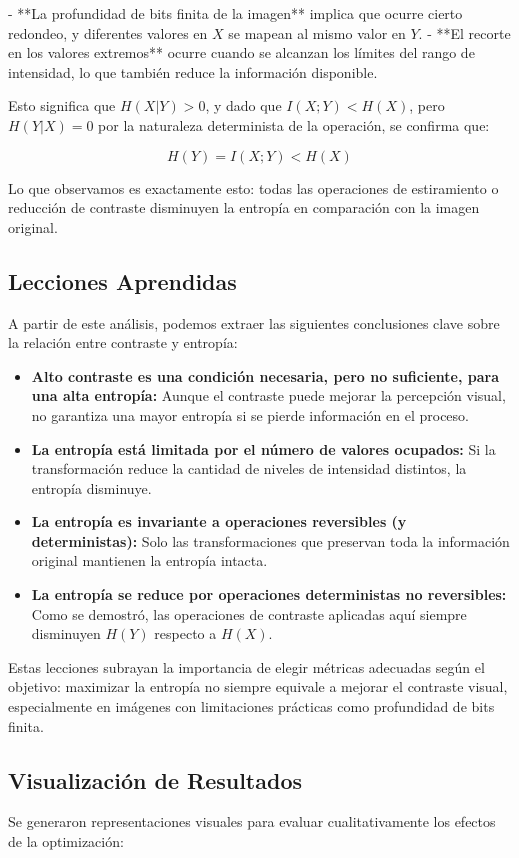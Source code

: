 - **La profundidad de bits finita de la imagen** implica que ocurre cierto redondeo, y diferentes valores en \(X\) se mapean al mismo valor en \(Y\).
- **El recorte en los valores extremos** ocurre cuando se alcanzan los límites del rango de intensidad, lo que también reduce la información disponible.

Esto significa que \(H(X|Y) > 0\), y dado que \(I(X;Y) < H(X)\), pero \(H(Y|X) = 0\) por la naturaleza determinista de la operación, se confirma que:

\[
H(Y) = I(X;Y) < H(X)
\]

Lo que observamos es exactamente esto: todas las operaciones de estiramiento o reducción de contraste disminuyen la entropía en comparación con la imagen original.

\subsection{Lecciones Aprendidas}
A partir de este análisis, podemos extraer las siguientes conclusiones clave sobre la relación entre contraste y entropía:

\begin{itemize}
    \item \textbf{Alto contraste es una condición necesaria, pero no suficiente, para una alta entropía:} Aunque el contraste puede mejorar la percepción visual, no garantiza una mayor entropía si se pierde información en el proceso.
    \item \textbf{La entropía está limitada por el número de valores ocupados:} Si la transformación reduce la cantidad de niveles de intensidad distintos, la entropía disminuye.
    \item \textbf{La entropía es invariante a operaciones reversibles (y deterministas):} Solo las transformaciones que preservan toda la información original mantienen la entropía intacta.
    \item \textbf{La entropía se reduce por operaciones deterministas no reversibles:} Como se demostró, las operaciones de contraste aplicadas aquí siempre disminuyen \(H(Y)\) respecto a \(H(X)\).
\end{itemize}

Estas lecciones subrayan la importancia de elegir métricas adecuadas según el objetivo: maximizar la entropía no siempre equivale a mejorar el contraste visual, especialmente en imágenes con limitaciones prácticas como profundidad de bits finita.

\subsection{Visualización de Resultados}
Se generaron representaciones visuales para evaluar cualitativamente los efectos de la optimización:

